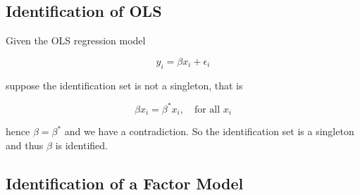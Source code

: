 \documentclass[11pt]{article}
\begin{document}
    \subsection{Identification of OLS}

        Given the OLS regression model

        \[
            y_i  =\beta x_i + \epsilon_i
        \]

        suppose the identification set is not a singleton, that is

        \[
            \beta x_i = \beta^* x_i, \quad\text{for all } x_i
        \]

        hence $\beta = \beta^*$ and we have a contradiction. So the identification set is a singleton and thus $\beta$ is identified.


    \subsection{Identification of a Factor Model}
\end{document}
